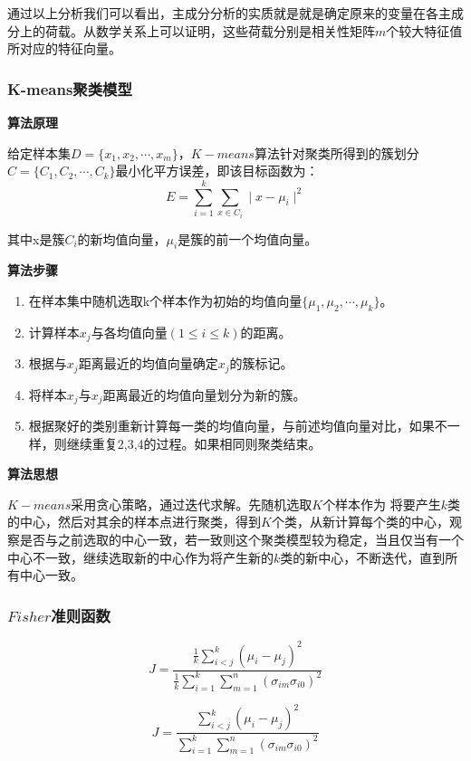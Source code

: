 \documentclass[withoutpreface,bwprint]{cumcmthesis} %
\begin{document}
\par 通过以上分析我们可以看出，主成分分析的实质就是就是确定原来的变量在各主成分上的荷载。从数学关系上可以证明，这些荷载分别是相关性矩阵$m$个较大特征值所对应的特征向量。

\subsubsection{K-means聚类模型}
\textbf{算法原理}
\par 给定样本集$D=\{x_1,x_2,\cdots,x_m\}$，$K-means$算法针对聚类所得到的簇划分$C=\{C_1,C_2,\cdots,C_k\}$最小化平方误差，即该目标函数为：
\begin{equation}
	E = \sum\limits_{i=1}^{k} \sum\limits_{x \in C_i} \mid x-\mu_i \mid ^2
\end{equation}

\par 其中x是簇$C_i$的新均值向量，$\mu_i$是簇的前一个均值向量。

\textbf{算法步骤}
\begin{enumerate}
	\item 在样本集中随机选取k个样本作为初始的均值向量$\{\mu_1,\mu_2,\cdots,\mu_k\}$。
	\item 计算样本$x_j$与各均值向量$(1 \leqslant i \leqslant k)$的距离。
	\item 根据与$x_j$距离最近的均值向量确定$x_j$的簇标记。
	\item 将样本$x_j$与$x_j$距离最近的均值向量划分为新的簇。
	\item 根据聚好的类别重新计算每一类的均值向量，与前述均值向量对比，如果不一样，则继续重复2,3,4的过程。如果相同则聚类结束。
\end{enumerate}
\textbf{算法思想}
\par $K-means$采用贪心策略，通过迭代求解。先随机选取$K$个样本作为 将要产生$k$类的中心，然后对其余的样本点进行聚类，得到$K$个类，从新计算每个类的中心，观察是否与之前选取的中心一致，若一致则这个聚类模型较为稳定，当且仅当有一个中心不一致，继续选取新的中心作为将产生新的$k$类的新中心，不断迭代，直到所有中心一致。
\subsubsection{$Fisher$准则函数}
$$
	J = \frac{\frac{1}{k}\sum\limits_{i<j}^{k}(\mu_i-\mu_j)^2	}{\frac{1}{k}\sum\limits_{i=1}^{k}\sum\limits_{m=1}^{n} (\sigma_{im}\sigma_{i0})^2}
$$

\begin{equation}
\label{Fisher2}
	J = \frac{\sum\limits_{i<j}^{k}(\mu_i-\mu_j)^2}{\sum\limits_{i=1}^{k}\sum\limits_{m=1}^{n}(\sigma_{im}\sigma_{i0})^2}
\end{equation}
\end{document}
